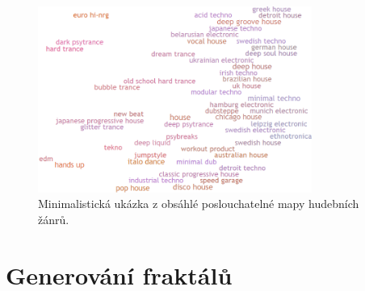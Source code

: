 \documentclass[thesis=B, czech]{FITthesis}[2019/03/06]
\let\oldquote\quote
\let\endoldquote\endquote
\renewenvironment{quote}[2][]
  {\if\relax\detokenize{#1}\relax
     \def\quoteauthor{#2}%
   \else
     \def\quoteauthor{#2~---~#1}%
   \fi
   \oldquote}
  {\par\nobreak\smallskip\hfill(\quoteauthor)%
   \endoldquote\addvspace{\bigskipamount}}
\begin{document}





\begin{figure}[h]
    \centering
    \includegraphics[width=0.8\textwidth]{images/everynoise.png}
        \caption{Minimalistická ukázka z obsáhlé poslouchatelné mapy hudebních žánrů.}
        \label{fig:everyNoise}
\end{figure}


\chapter{Generování fraktálů}


\end{document}

